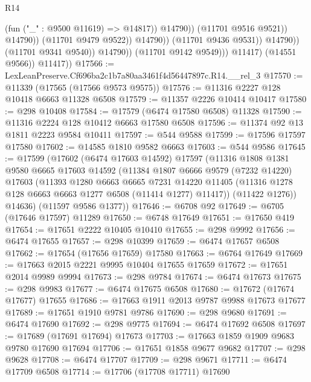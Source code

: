 \begin{lexlean}{R14}
\begin{coremodule}
                                              (fun ("_" : @9500 @11619) => @14817))
                                            @14790))
                                        (@11701 @9516 @9521))
                                      @14790))
                                  (@11701 @9479 @9522))
                                @14790))
                            (@11701 @9436 @9531))
                          @14790))
                      (@11701 @9341 @9540))
                    @14790))
                (@11701 @9142 @9549)))
            @11417)
          (@14551 @9566))
        @11417))
@17566 := LexLeanPreserve.Cf696ba2c1b7a80aa3461f4d56447897c.R14.__rel_3
@17570 := @11339 (@17565 (@17566 @9573 @9575))
@17576 := @11316 @2227 @128 @10418 @6663 @11328 @6508
@17579 := @11357 @2226 @10414 @10417
@17580 := @298 @10408
@17584 := @17579 (@6474 @17580 @6508) @11328
@17590 := @11316 @2224 @128 @10412 @6663 @17580 @6508
@17596 := @11374 @92 @13 @1811 @2223 @9584 @10411
@17597 := @544 @9588
@17599 := @17596 @17597 @17580
@17602 := @14585 @1810 @9582 @6663
@17603 := @544 @9586
@17645 := @17599
    (@17602
      (@6474 @17603 @14592)
      @17597
      (@11316
        @1808
        @1381
        @9580
        @6665
        @17603
        @14592
        (@11384
          @1807
          @6666
          @9579
          (@7232 @14220)
          @17603
          (@11393
            @1280
            @6663
            @6665
            @7231
            @14220
            @11405
            (@11316 @1278 @128 @6663 @6663 @1277 @6508 (@11414 @1277) @11417))
          (@11422 @1276))
        @14636)
      (@11597 @9586 @1377))
@17646 := @6708 @92
@17649 := @6705 (@17646 @17597) @11289
@17650 := @6748 @17649
@17651 := @17650 @419
@17654 := @17651 @2222 @10405 @10410
@17655 := @298 @9992
@17656 := @6474 @17655
@17657 := @298 @10399
@17659 := @6474 @17657 @6508
@17662 := @17654 (@17656 @17659) @17580
@17663 := @6764 @17649
@17669 := @17663 @2015 @2221 @9995 @10404 @17655 @17659
@17672 := @17651 @2014 @9989 @9994
@17673 := @298 @9784
@17674 := @6474 @17673
@17675 := @298 @9983
@17677 := @6474 @17675 @6508
@17680 := @17672 (@17674 @17677) @17655
@17686 := @17663 @1911 @2013 @9787 @9988 @17673 @17677
@17689 := @17651 @1910 @9781 @9786
@17690 := @298 @9680
@17691 := @6474 @17690
@17692 := @298 @9775
@17694 := @6474 @17692 @6508
@17697 := @17689 (@17691 @17694) @17673
@17703 := @17663 @1859 @1909 @9683 @9780 @17690 @17694
@17706 := @17651 @1858 @9677 @9682
@17707 := @298 @9628
@17708 := @6474 @17707
@17709 := @298 @9671
@17711 := @6474 @17709 @6508
@17714 := @17706 (@17708 @17711) @17690

\end{coremodule}
\end{lexlean}
